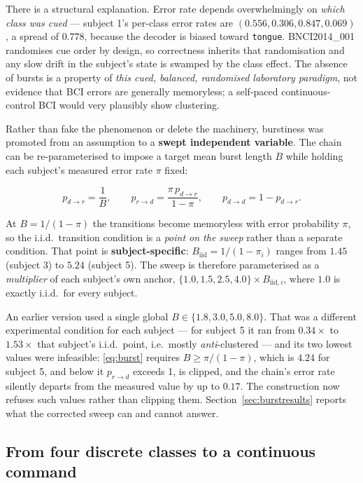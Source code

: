 \documentclass[11pt,a4paper]{article}
\theoremstyle{plain}
\theoremstyle{definition}
\begin{document}
There is a structural explanation. Error rate depends overwhelmingly on
\emph{which class was cued} --- subject 1's per-class error rates are
$(0.556, 0.306, 0.847, 0.069)$, a spread of $0.778$, because the
decoder is biased toward \texttt{tongue}. BNCI2014\_001 randomises cue
order by design, so correctness inherits that randomisation and any slow
drift in the subject's state is swamped by the class effect. The absence
of bursts is a property of \emph{this cued, balanced, randomised
laboratory paradigm}, not evidence that BCI errors are generally
memoryless; a self-paced continuous-control BCI would very plausibly
show clustering.

Rather than fake the phenomenon or delete the machinery, burstiness was
promoted from an assumption to a \textbf{swept independent variable}.
The chain can be re-parameterised to impose a target mean burst length
$B$ while holding each subject's measured error rate $\pi$ fixed:

\begin{equation}
p_{d\to r} = \frac{1}{B},
\qquad
p_{r \to d} = \frac{\pi\, p_{d \to r}}{1-\pi},
\qquad
p_{d\to d} = 1 - p_{d\to r}.
\label{eq:burst}
\end{equation}

At $B = 1/(1-\pi)$ the transitions become memoryless with error
probability $\pi$, so the i.i.d.\ transition condition is a \emph{point
on the sweep} rather than a separate condition. That point is
\textbf{subject-specific}: $B_{\mathrm{iid}} = 1/(1-\pi_i)$ ranges from
$1.45$ (subject 3) to $5.24$ (subject 5). The sweep is therefore
parameterised as a \emph{multiplier} of each subject's own anchor,
$\{1.0, 1.5, 2.5, 4.0\} \times B_{\mathrm{iid},i}$, where $1.0$ is
exactly i.i.d.\ for every subject.

An earlier version used a single global $B \in \{1.8, 3.0, 5.0, 8.0\}$.
That was a different experimental condition for each subject --- for
subject 5 it ran from $0.34\times$ to $1.53\times$ that subject's i.i.d.\
point, i.e.\ mostly \emph{anti}-clustered --- and its two lowest values
were infeasible: \eqref{eq:burst} requires $B \geq \pi/(1-\pi)$, which is
$4.24$ for subject 5, and below it $p_{r \to d}$ exceeds 1, is clipped,
and the chain's error rate silently departs from the measured value by up
to $0.17$. The construction now refuses such values rather than clipping
them. Section~\ref{sec:burstresults} reports what the corrected sweep can
and cannot answer.

\subsection{From four discrete classes to a continuous command}
\label{sec:modality}
\end{document}
